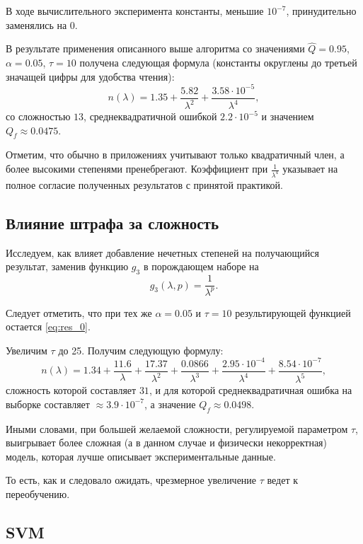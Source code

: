 \documentclass[12pt,a4paper]{article}
\begin{document}
В ходе вычислительного эксперимента константы, меньшие $10^{-7}$, принудительно
заменялись на $0$.

В результате применения описанного выше алгоритма со значениями
$\hat{Q} = 0.95$, $\alpha = 0.05$, $\tau = 10$ получена следующая формула
(константы округлены до третьей значащей цифры для удобства чтения):
\begin{equation}
  n(\lambda) = 1.35 + \frac{5.82}{\lambda^2} + \frac{3.58 \cdot 10^{-5}}{\lambda^4},
  \label{eq:res_0}
\end{equation}
со сложностью $13$, среднеквадратичной ошибкой $2.2 \cdot 10^{-5}$ и значением $Q_f \approx 0.0475$.

Отметим, что обычно в приложениях учитывают только квадратичный член, а более
высокими степенями пренебрегают. Коэффициент при $\frac{1}{\lambda^4}$ указывает
на полное согласие полученных результатов с принятой практикой.

\subsection{Влияние штрафа за сложность}

Исследуем, как влияет добавление нечетных степеней на получающийся результат,
заменив функцию $g_3$ в порождающем наборе на
\[
  g_3(\lambda, p) = \frac{1}{\lambda^p}.
\]

Следует отметить, что при тех же $\alpha = 0.05$ и $\tau = 10$ результирующей функцией остается
\eqref{eq:res_0}.

Увеличим $\tau$ до 25. Получим следующую формулу:
\[
  n(\lambda) = 1.34 + \frac{11.6}{\lambda} + \frac{17.37}{\lambda^2} + \frac{0.0866}{\lambda^3} + \frac{2.95 \cdot 10^{-4}}{\lambda^4} + \frac{8.54 \cdot 10^{-7}}{\lambda^5},
\]
сложность которой составляет $31$, и для которой среднеквадратичная ошибка
на выборке составляет $\approx 3.9 \cdot 10^{-7}$,
а значение $Q_f \approx 0.0498$.

Иными словами, при большей желаемой сложности,
регулируемой параметром $\tau$, выигрывает более сложная (а в данном случае и
физически некорректная) модель, которая лучше описывает экспериментальные данные.

То есть, как и следовало ожидать, чрезмерное увеличение $\tau$ ведет к переобучению.

\subsection{SVM}
\end{document}
